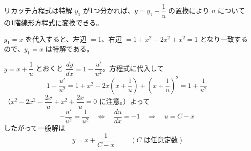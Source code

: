 
リカッチ方程式は特解 $y_{1}$ が1つ分かれば、$y = y_{1} + \dfrac{1}{u}$ の置換により $u$ についての1階線形方程式に変換できる。

$y_{1} = x$ を代入すると、左辺 $= 1$、右辺 $= 1 + x^{2} - 2x^{2} + x^{2} = 1$ となり一致するので、$y_{1} = x$ は特解である。

$y = x + \dfrac{1}{u}$ とおくと $\dfrac{dy}{dx} = 1 - \dfrac{u'}{u^{2}}$。方程式に代入して
\[
1 - \frac{u'}{u^{2}} = 1 + x^{2} - 2x\left(x + \frac{1}{u}\right) + \left(x + \frac{1}{u}\right)^{2}
= 1 + \frac{1}{u^{2}}
\]
（$x^{2} - 2x^{2} - \dfrac{2x}{u} + x^{2} + \dfrac{2x}{u} = 0$ に注意。）よって
\[
-\frac{u'}{u^{2}} = \frac{1}{u^{2}}
\quad\Longleftrightarrow\quad
\frac{du}{dx} = -1
\quad\Longrightarrow\quad
u = C - x
\]
したがって一般解は
\[
\boxed{\; y = x + \frac{1}{C - x} \;}
\qquad (C \text{ は任意定数})
\]
